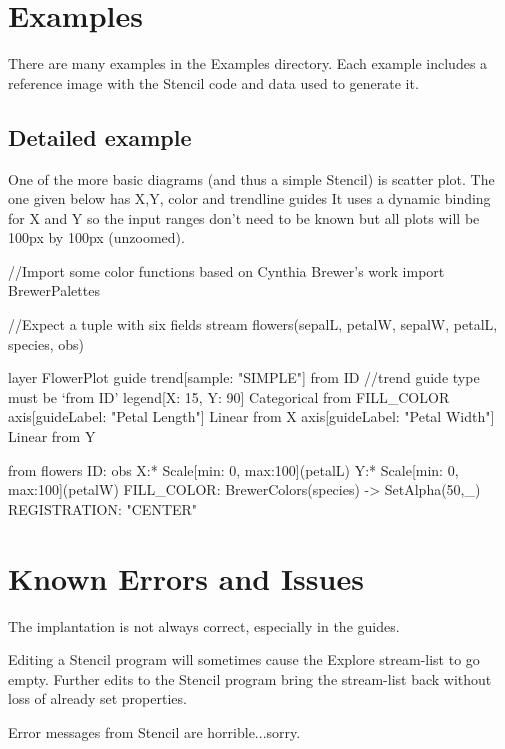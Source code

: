 \documentclass{article}
\begin{document}
\section{Examples}
There are many examples in the Examples directory.
Each example includes a reference image with the Stencil code and data used to generate it.

\subsection{Detailed example}
One of the more basic diagrams (and  thus a simple Stencil) is scatter plot.  
The one given below has X,Y, color and trendline guides
It uses a dynamic binding for X and Y so the input ranges don't need to be known but all plots will be 100px by 100px (unzoomed).

\begin{verbatimtab}[3]
//Import some color functions based on Cynthia Brewer's work
import BrewerPalettes			

//Expect a tuple with six fields
stream flowers(sepalL, petalW, sepalW,  petalL, species, obs)		

layer FlowerPlot
guide
  trend[sample: "SIMPLE"] from ID 							//trend guide type must be `from ID'
  legend[X: 15, Y: 90] Categorical from FILL\_COLOR	
  axis[guideLabel: "Petal Length"] Linear from X
  axis[guideLabel: "Petal Width"] Linear from Y			

from flowers
   ID: obs
   X:* Scale[min: 0, max:100](petalL)	
   Y:* Scale[min: 0, max:100](petalW)
   FILL\_COLOR: BrewerColors(species) -> SetAlpha(50,_)
   REGISTRATION: "CENTER"
\end{verbatimtab}
	

\section{Known Errors and Issues}
The implantation is not always correct, especially in the guides.

Editing a Stencil program will sometimes cause the Explore stream-list to go empty.  
Further edits to the Stencil program bring the stream-list back without loss of already set properties.

Error messages from Stencil are horrible...sorry.
\end{document}
